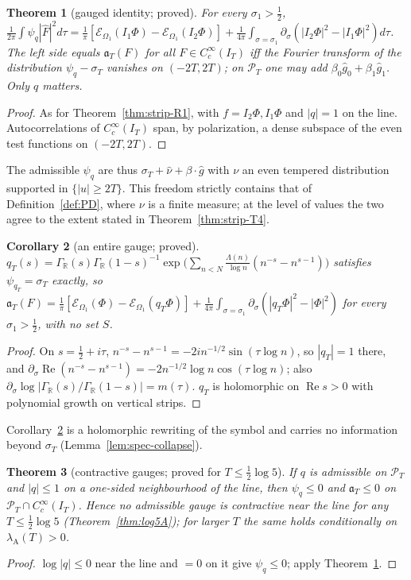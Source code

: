\documentclass[11pt]{amsart}
\newtheorem{theorem}{Theorem}[section]
\newtheorem{corollary}[theorem]{Corollary}
\theoremstyle{definition}
\theoremstyle{remark}
\newcommand{\R}{\mathbb R}
\newcommand{\Rel}{\operatorname{Re}}
\newcommand{\PT}{\mathcal P_T}
\newcommand{\IT}{I_T}
\newcommand{\lamA}{\lambda_{\mathrm A}(T)}
\newcommand{\sT}{\sigma_T}
\newcommand{\gh}[1]{\widehat g_{#1}}
\newcommand{\nuh}{\widehat\nu}
\newcommand{\Fh}{\widehat F}
\begin{document}
\begin{theorem}[gauged identity; proved]\label{thm:strip-T1}
For every $\sigma_1>\frac12$,
$\frac1{2\pi}\int\psi_q|\Fh|^2d\tau=\frac1\pi[\mathcal E_{\Omega_1}(I_1\Phi)-\mathcal E_{\Omega_1}(I_2\Phi)]
+\frac1{4\pi}\int_{\sigma=\sigma_1}\partial_\sigma(|I_2\Phi|^2-|I_1\Phi|^2)d\tau$.
The left side equals $\mathfrak a_T(F)$ for all $F\in C_c^\infty(\IT)$ iff the Fourier transform of the distribution $\psi_q-\sT$
vanishes on $(-2T,2T)$; on $\PT$ one may add $\beta_0\gh0+\beta_1\gh1$. Only $q$ matters.
\end{theorem}
\begin{proof}
As for Theorem~\ref{thm:strip-R1}, with $f=I_2\Phi,I_1\Phi$ and $|q|=1$ on the line. Autocorrelations of $C_c^\infty(\IT)$ span, by
polarization, a dense subspace of the even test functions on $(-2T,2T)$.
\end{proof}
The admissible $\psi_q$ are thus $\sT+\nuh+\beta\cdot\widehat g$ with $\nu$ an even tempered distribution supported in
$\{|u|\ge2T\}$. This freedom strictly contains that of Definition~\ref{def:PD}, where $\nu$ is a finite measure; at the level of
values the two agree to the extent stated in Theorem~\ref{thm:strip-T4}.

\begin{corollary}[an entire gauge; proved]\label{cor:strip-T1p}
$q_T(s)=\Gamma_\R(s)\Gamma_\R(1-s)^{-1}\exp\big(\sum_{n<N}\frac{\Lambda(n)}{\log n}(n^{-s}-n^{s-1})\big)$ satisfies $\psi_{q_T}=\sT$
exactly, so $\mathfrak a_T(F)=\frac1\pi[\mathcal E_{\Omega_1}(\Phi)-\mathcal E_{\Omega_1}(q_T\Phi)]+\frac1{4\pi}\int_{\sigma=\sigma_1}\partial_\sigma(|q_T\Phi|^2-|\Phi|^2)$
for every $\sigma_1>\frac12$, with no set $S$.
\end{corollary}
\begin{proof}
On $s=\frac12+i\tau$, $n^{-s}-n^{s-1}=-2in^{-1/2}\sin(\tau\log n)$, so $|q_T|=1$ there, and
$\partial_\sigma\Rel(n^{-s}-n^{s-1})=-2n^{-1/2}\log n\cos(\tau\log n)$; also $\partial_\sigma\log|\Gamma_\R(s)/\Gamma_\R(1-s)|=m(\tau)$.
$q_T$ is holomorphic on $\Rel s>0$ with polynomial growth on vertical strips.
\end{proof}
Corollary~\ref{cor:strip-T1p} is a holomorphic rewriting of the symbol and carries no information beyond $\sT$
(Lemma~\ref{lem:spec-collapse}).

\begin{theorem}[contractive gauges; proved for $T\le\frac12\log5$]\label{thm:strip-T3}
If $q$ is admissible on $\PT$ and $|q|\le1$ on a one-sided neighbourhood of the line, then $\psi_q\le0$ and $\mathfrak a_T\le0$ on
$\PT\cap C_c^\infty(\IT)$. Hence no admissible gauge is contractive near the line for any $T\le\frac12\log5$
(Theorem~\ref{thm:log5A}); for larger $T$ the same holds conditionally on $\lamA>0$.
\end{theorem}
\begin{proof}
$\log|q|\le0$ near the line and $=0$ on it give $\psi_q\le0$; apply Theorem~\ref{thm:strip-T1}.
\end{proof}
\end{document}
